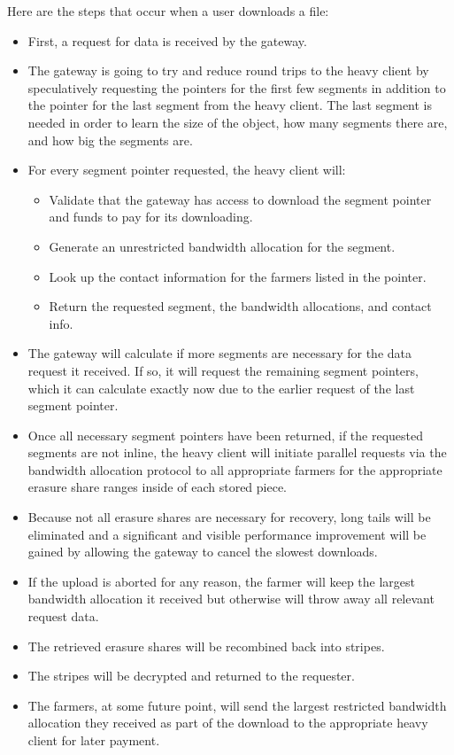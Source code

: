 \documentclass[a4paper,10pt]{article} \usepackage[utf8]{inputenc}
\begin{document}
Here are the steps that occur when a user downloads a file:

\begin{itemize}
\item First, a request for data is received by the gateway.
\item The gateway is going to try and reduce round trips to the heavy client
  by speculatively requesting the pointers for the first few segments in
  addition to the pointer for the last segment from the heavy client. The last
  segment is needed in order to learn the size of the object, how many segments
  there are, and how big the segments are.
\item For every segment pointer requested, the heavy client will:
  \begin{itemize}
  \item Validate that the gateway has access to download the segment pointer
    and funds to pay for its downloading.
  \item Generate an unrestricted bandwidth allocation for the segment.
  \item Look up the contact information for the farmers listed in the pointer.
  \item Return the requested segment, the bandwidth allocations, and contact
    info.
  \end{itemize}
\item The gateway will calculate if more segments are necessary for the
  data request it received. If so, it will request the remaining segment
  pointers, which it can calculate exactly now due to the earlier request of
  the last segment pointer.
\item Once all necessary segment pointers have been returned, if the requested
  segments are not inline, the heavy client will initiate parallel requests
  via the bandwidth allocation protocol to all appropriate farmers for the
  appropriate erasure share ranges inside of each stored piece.
\item Because not all erasure shares are necessary for recovery, long tails
  will be eliminated and a significant and visible performance improvement will
  be gained by allowing the gateway to cancel the slowest downloads.
\item If the upload is aborted for any reason, the farmer will keep the
  largest bandwidth allocation it received but otherwise will throw away all
  relevant request data.
\item The retrieved erasure shares will be recombined back into stripes.
\item The stripes will be decrypted and returned to the requester.
\item The farmers, at some future point, will send the largest restricted
  bandwidth allocation they received as part of the download to the appropriate
  heavy client for later payment.
\end{itemize}
\end{document}
